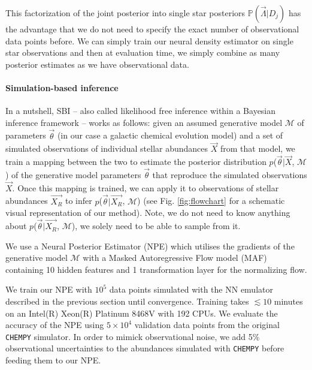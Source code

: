 \documentclass{aa}
\begin{document}
This factorization of the joint posterior into single star posteriors $\mathbb{P}(\vec\Lambda|D_j)$ has the advantage that we do not need to specify the exact number of observational data points before. We can simply train our neural density estimator on single star observations and then at evaluation time, we simply combine as many posterior estimates as we have observational data.


\paragraph{Simulation-based inference}
In a nutshell, SBI \citep[e.g.][]{Cranmer2020,Papamakarios:2021,Gloeckler2024AllinoneSI} -- also called likelihood free inference within a Bayesian inference framework -- works as follows: given an assumed generative model $\mathcal{M}$ of parameters $\Vec{\theta}$ (in our case a galactic chemical evolution model) and a set of simulated observations of individual stellar abundances $\Vec{X}$ from that model, we train a mapping between the two to estimate the posterior distribution $p$($\Vec{\theta}|\Vec{X}$, $\mathcal{M}$) of the generative model parameters $\Vec{\theta}$ that reproduce the simulated observations $\Vec{X}$. Once this mapping is trained, we can apply it to observations of stellar abundances $\Vec{X_R}$ to infer $p$($\Vec{\theta}|\Vec{X_R}$, $\mathcal{M}$) (see Fig. \ref{fig:flowchart} for a schematic visual representation of our method). Note, we do not need to know anything about $p$($\Vec{\theta}|\Vec{X_R}$, $\mathcal{M}$), we solely need to be able to sample from it.

We use a Neural Posterior Estimator (NPE) \cite{zeghal2022neuralposteriorestimationdifferentiable} which utilises the gradients of the generative model $\mathcal{M}$ with a Masked Autoregressive Flow model (MAF) \cite{papamakarios2018maskedautoregressiveflowdensity} containing 10 hidden features and 1 transformation layer for the normalizing flow.

We train our NPE with $10^5$ data points simulated with the NN emulator described in the previous section until convergence. Training takes $\lesssim10$ minutes on an Intel(R) Xeon(R) Platinum 8468V with 192 CPUs.
We evaluate the accuracy of the NPE using $5\times10^4$ validation data points from the original \texttt{CHEMPY} simulator. In order to mimick observational noise, we add 5\% observational uncertainties to the abundances simulated with \texttt{CHEMPY} before feeding them to our NPE. 
\end{document}
